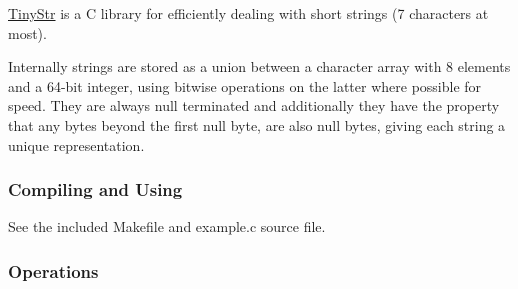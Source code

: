 \hyperlink{unionTinyStr}{Tiny\+Str} is a C library for efficiently dealing with short strings (7 characters at most).

Internally strings are stored as a union between a character array with 8 elements and a 64-\/bit integer, using bitwise operations on the latter where possible for speed. They are always null terminated and additionally they have the property that any bytes beyond the first null byte, are also null bytes, giving each string a unique representation.

\subsubsection*{Compiling and Using}

See the included {\ttfamily Makefile} and {\ttfamily example.\+c} source file.

\subsubsection*{Operations}

